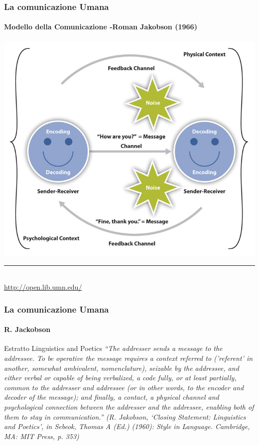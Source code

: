 \begin{frame}
	\frametitle{La comunicazione Umana}
	\framesubtitle{Modello della Comunicazione -Roman Jakobson (1966)}
	\addtocounter{nframe}{1}

	\begin{center}
		\includegraphics[width=.73\textwidth]{imgs/RomanJakobson.jpg}
	\end{center}
	\noindent\rule{5cm}{0.01cm}
	\\\tiny\url{http://open.lib.umn.edu/}

\end{frame}

\begin{frame}
	\frametitle{La comunicazione Umana}
	\framesubtitle{R. Jackobson}
	\addtocounter{nframe}{1}

	\begin{block}{Estratto Linguistics and Poetics}
		\textit{“The addresser sends a message to the addressee. To be
			operative the message requires a context referred to
			('referent' in another, somewhat ambivalent, nomenclature),
			seizable by the addressee, and either verbal or capable of
			being verbalized, a code fully, or at least partially, common to
			the addresser and addressee (or in other words, to the
			encoder and decoder of the message); and finally, a contact,
			a physical channel and psychological connection between the
			addresser and the addressee, enabling both of them to stay in
			communication.” (R. Jakobson, ‘Closing Statement:
			Linguistics and Poetics’, in Sebeok, Thomas A (Ed.) (1960):
			Style in Language. Cambridge, MA: MIT Press, p. 353)}
	\end{block}

\end{frame}

